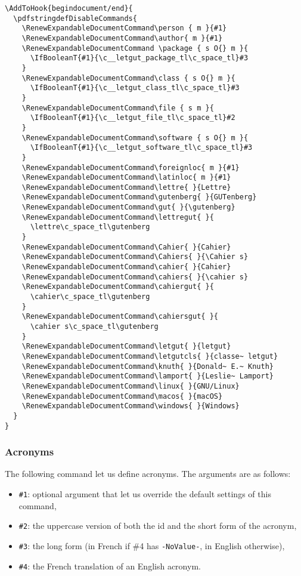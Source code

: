\documentclass{letgut}
\begin{document}
\begin{lstlisting}
\AddToHook{begindocument/end}{
  \pdfstringdefDisableCommands{
    \RenewExpandableDocumentCommand\person { m }{#1}
    \RenewExpandableDocumentCommand\author{ m }{#1}
    \RenewExpandableDocumentCommand \package { s O{} m }{
      \IfBooleanT{#1}{\c__letgut_package_tl\c_space_tl}#3
    }
    \RenewExpandableDocumentCommand\class { s O{} m }{
      \IfBooleanT{#1}{\c__letgut_class_tl\c_space_tl}#3
    }
    \RenewExpandableDocumentCommand\file { s m }{
      \IfBooleanT{#1}{\c__letgut_file_tl\c_space_tl}#2
    }
    \RenewExpandableDocumentCommand\software { s O{} m }{
      \IfBooleanT{#1}{\c__letgut_software_tl\c_space_tl}#3
    }
    \RenewExpandableDocumentCommand\foreignloc{ m }{#1}
    \RenewExpandableDocumentCommand\latinloc{ m }{#1}
    \RenewExpandableDocumentCommand\lettre{ }{Lettre}
    \RenewExpandableDocumentCommand\gutenberg{ }{GUTenberg}
    \RenewExpandableDocumentCommand\gut{ }{\gutenberg}
    \RenewExpandableDocumentCommand\lettregut{ }{
      \lettre\c_space_tl\gutenberg
    }
    \RenewExpandableDocumentCommand\Cahier{ }{Cahier}
    \RenewExpandableDocumentCommand\Cahiers{ }{\Cahier s}
    \RenewExpandableDocumentCommand\cahier{ }{Cahier}
    \RenewExpandableDocumentCommand\cahiers{ }{\cahier s}
    \RenewExpandableDocumentCommand\cahiergut{ }{
      \cahier\c_space_tl\gutenberg
    }
    \RenewExpandableDocumentCommand\cahiersgut{ }{
      \cahier s\c_space_tl\gutenberg
    }
    \RenewExpandableDocumentCommand\letgut{ }{letgut}
    \RenewExpandableDocumentCommand\letgutcls{ }{classe~ letgut}
    \RenewExpandableDocumentCommand\knuth{ }{Donald~ E.~ Knuth}
    \RenewExpandableDocumentCommand\lamport{ }{Leslie~ Lamport}
    \RenewExpandableDocumentCommand\linux{ }{GNU/Linux}
    \RenewExpandableDocumentCommand\macos{ }{macOS}
    \RenewExpandableDocumentCommand\windows{ }{Windows}
  }
}
\end{lstlisting}

\subsubsection{Acronyms}
\label{ImplementationDocumentcommandsAcronyms-93yg55h0jlj0}
The following command let us define acronyms. The arguments are as follows:
\begin{itemize}
\item \lstinline+#1+: optional argument that let us override the default settings of this
command,
\item \lstinline+#2+: the uppercase version of both the id and the short form of the acronym,
\item \lstinline+#3+: the long form (in French if \#4 has \lstinline+-NoValue-+, in English otherwise),
\item \lstinline+#4+: the French translation of an English acronym.
\end{itemize}
\end{document}

